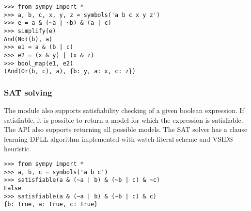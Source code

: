 \begin{verbatim}
>>> from sympy import *
>>> a, b, c, x, y, z = symbols('a b c x y z')
>>> e = a & (~a | ~b) & (a | c)
>>> simplify(e)
And(Not(b), a)
>>> e1 = a & (b | c)
>>> e2 = (x & y) | (x & z)
>>> bool_map(e1, e2)
(And(Or(b, c), a), {b: y, a: x, c: z})
\end{verbatim}

\subsubsection{SAT solving}

The module also supports satisfiability checking of a given
boolean expression. If satisfiable, it is possible to return 
a model for which the expression is satisfiable. The API also
supports returning all possible models. The SAT solver has 
a clause learning DPLL algorithm implemented with watch 
literal scheme and VSIDS heuristic\cite{moskewicz2008method}.

\begin{verbatim}
>>> from sympy import *
>>> a, b, c = symbols('a b c')
>>> satisfiable(a & (~a | b) & (~b | c) & ~c)
False
>>> satisfiable(a & (~a | b) & (~b | c) & c)
{b: True, a: True, c: True}
\end{verbatim}
